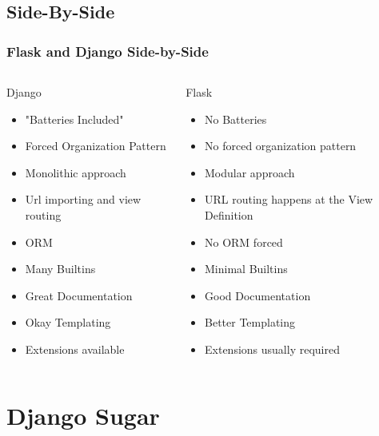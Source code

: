 \documentclass{beamer}
\begin{document}
\subsection{Side-By-Side}
\begin{frame}
\frametitle{Flask and Django Side-by-Side}
\begin{columns}
  \begin{column}[T]{5cm}
  Django
  
  \begin{itemize}
    \item "Batteries Included"
    \item Forced Organization Pattern
    \item Monolithic approach
    \item Url importing and view routing
    \item ORM
    \item Many Builtins
    \item Great Documentation
    \item Okay Templating
    \item Extensions available
  \end{itemize}
  \end{column}
  
  \begin{column}[T]{5cm}
  Flask
  
  \begin{itemize}
    \item No Batteries
    \item No forced organization pattern
    \item Modular approach
    \item URL routing happens at the View Definition
    \item No ORM forced
    \item Minimal Builtins
    \item Good Documentation
    \item Better Templating
    \item Extensions usually required
    \end{itemize}  
  \end{column}
\end{columns}
\end{frame}

\section{Django Sugar}
\end{document}
